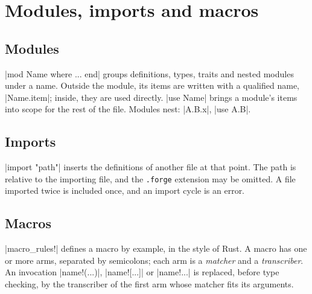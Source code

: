 \chapter{Modules, imports and macros}
\label{ch:modules}

\section{Modules}
\label{sec:modules}

\fc|mod Name where ... end| groups definitions, types, traits and nested
modules under a name. Outside the module, its items are written with a
qualified name, \fc|Name.item|; inside, they are used directly.
\fc|use Name| brings a module's items into scope for the rest of the file.
Modules nest: \fc|A.B.x|, \fc|use A.B|.


\section{Imports}
\label{sec:imports}
\fc|import "path"| inserts the definitions of another file at that point.
The path is relative to the importing file, and the \texttt{.forge}
extension may be omitted. A file imported twice is included once, and an
import cycle is an error.


\section{Macros}
\label{sec:macros}

\fc|macro_rules!| defines a macro by example, in the style of Rust. A macro
has one or more arms, separated by semicolons; each arm is a \emph{matcher}
and a \emph{transcriber}. An invocation \fc|name!(...)|, \fc|name![...]| or
\fc|name!{...}| is replaced, before type checking, by the transcriber of the
first arm whose matcher fits its arguments.


